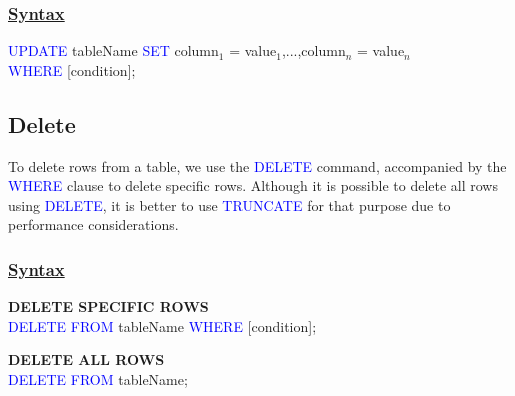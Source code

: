 \subsubsection*{\underline{\textbf{Syntax}}}
\begin{tcolorbox}[title = Update]
\textcolor{blue}{UPDATE} tableName \textcolor{blue}{SET} column$_{1}$ = value$_{1}$,...,column$_{n}$ = value$_{n}$\\
\textcolor{blue}{WHERE} {[condition]};
\end{tcolorbox}

\subsection{Delete}
\begin{tcolorbox}[title = Definition]
To delete rows from a table, we use the \textcolor{blue}{DELETE} command, accompanied by the \textcolor{blue}{WHERE} clause to delete specific rows. Although it is possible to delete all rows using \textcolor{blue}{DELETE}, it is better to use \textcolor{blue}{TRUNCATE} for that purpose due to performance considerations.
\end{tcolorbox}

\subsubsection*{\underline{\textbf{Syntax}}}
\begin{tcolorbox}[title = Delete]
\textbf{DELETE SPECIFIC ROWS}\\
\textcolor{blue}{DELETE FROM} tableName \textcolor{blue}{WHERE} {[condition]};

\textbf{DELETE ALL ROWS}\\
\textcolor{blue}{DELETE FROM} tableName;
\end{tcolorbox}

